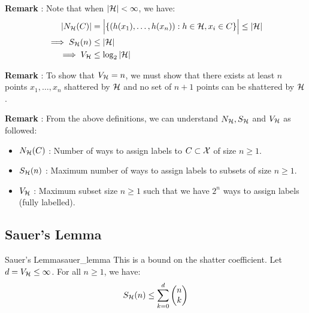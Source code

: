 \noindent\textbf{Remark} : Note that when $|\mathcal{H}| < \infty$, we have:
\begin{align*}
    |N_{\mathcal{H}}(C)| &= \Big| 
        \{(h(x_1), \dots, h(x_n)) : h\in\mathcal{H}, x_i \in C\}
     \Big| \le |\mathcal{H}| \\
    \implies S_{\mathcal{H}}(n) &\le |\mathcal{H}| \\
    \implies V_{\mathcal{H}} &\le \log_2|\mathcal{H}|
\end{align*}


\noindent \textbf{Remark} : To show that $V_{\mathcal{H}}=n$, we must show that there exists at least $n$ points $x_1, \dots, x_n$ shattered by $\mathcal{H}$ and no set of $n+1$ points can be shattered by $\mathcal{H}$. 

\noindent\newline \textbf{Remark} : From the above definitions, we can understand $N_{\mathcal{H}}, S_{\mathcal{H}}$ and $V_{\mathcal{H}}$ as followed:
\begin{itemize}
    \item $N_{\mathcal{H}}(C)$ : Number of ways to assign labels to $C\subset \mathcal{X}$ of size $n\ge1$.
    \item $S_{\mathcal{H}}(n)$ : Maximum number of ways to assign labels to subsets of size $n\ge1$.
    \item $V_{\mathcal{H}}$ : Maximum subset size $n\ge1$ such that we have $2^n$ ways to assign labels (fully labelled).
\end{itemize}



\subsection{Sauer's Lemma}
\begin{theorem}{Sauer's Lemma}{sauer_lemma}
    This is a bound on the shatter coefficient. Let $d=V_{\mathcal{H}}\le\infty$. For all $n\ge1$, we have:
    \begin{align*}
        S_{\mathcal{H}}(n) \le \sum_{k = 0}^d \begin{pmatrix}
            n \\ k
        \end{pmatrix}
    \end{align*}
\end{theorem}

